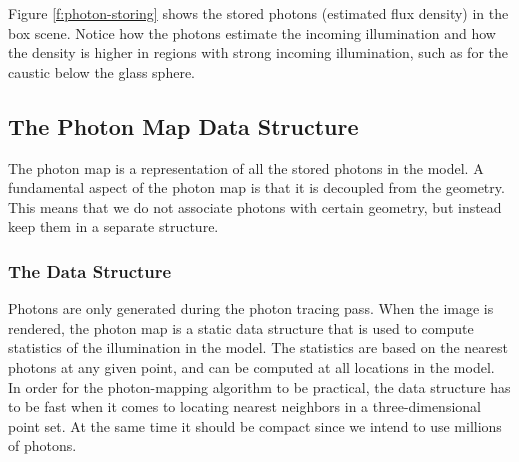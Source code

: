 Figure \ref{f:photon-storing} shows the stored photons (estimated flux density) in the box scene. Notice how the photons estimate the incoming illumination and how the density is higher in regions with strong incoming illumination, such as for the caustic below the glass sphere.



\subsection{The Photon Map Data Structure}
The photon map is a representation of all the stored photons in the model. A fundamental aspect of the photon map is that it is decoupled from the geometry. This means that we do not associate photons with certain geometry, but instead keep them in a separate structure.


\subsubsection{The Data Structure}
Photons are only generated during the photon tracing pass. When the image is rendered, the photon map is a static data structure that is used to compute statistics of the illumination in the model. The statistics are based on the nearest photons at any given point, and can be computed at all locations in the model. In order for the photon-mapping algorithm to be practical, the data structure has to be fast when it comes to locating nearest neighbors in a three-dimensional point set. At the same time it should be compact since we intend to use millions of photons.

